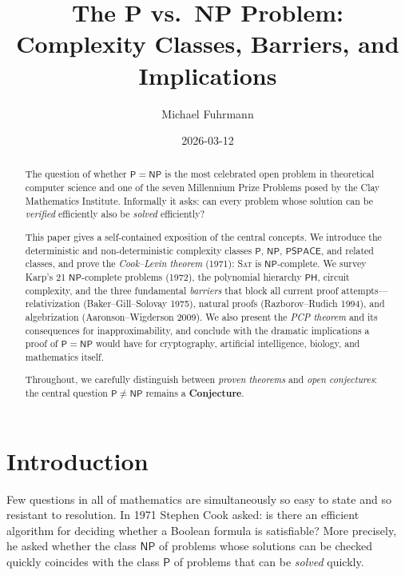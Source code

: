 \documentclass[12pt,a4paper]{amsart}
\title[The P vs.\ NP Problem]{%
  The P vs.\ NP Problem:\\
  Complexity Classes, Barriers, and Implications}
\author{Michael Fuhrmann}
\date{2026-03-12}
\theoremstyle{definition}
\newcommand{\Pclass}{\mathsf{P}}
\newcommand{\NP}{\mathsf{NP}}
\newcommand{\PSPACE}{\mathsf{PSPACE}}
\newcommand{\PH}{\mathsf{PH}}
\newcommand{\SAT}{\textsc{Sat}}
\begin{document}
\begin{abstract}
The question of whether $\Pclass = \NP$ is the most celebrated open problem in
theoretical computer science and one of the seven Millennium Prize Problems posed
by the Clay Mathematics Institute.  Informally it asks: can every problem whose
solution can be \emph{verified} efficiently also be \emph{solved} efficiently?

This paper gives a self-contained exposition of the central concepts.  We
introduce the deterministic and non-deterministic complexity classes
$\Pclass$, $\NP$, $\PSPACE$, and related classes, and prove the
\emph{Cook--Levin theorem} (1971): \SAT{} is $\NP$-complete.  We survey
Karp's 21 $\NP$-complete problems (1972), the polynomial hierarchy $\PH$,
circuit complexity, and the three fundamental \emph{barriers} that block all
current proof attempts---relativization (Baker--Gill--Solovay 1975),
natural proofs (Razborov--Rudich 1994), and algebrization (Aaronson--Wigderson
2009).  We also present the \emph{PCP theorem} and its consequences for
inapproximability, and conclude with the dramatic implications a proof of
$\Pclass = \NP$ would have for cryptography, artificial intelligence, biology,
and mathematics itself.

Throughout, we carefully distinguish between \emph{proven theorems} and
\emph{open conjectures}: the central question $\Pclass \neq \NP$ remains a
\textbf{Conjecture}.
\end{abstract}

\maketitle

\tableofcontents

\section{Introduction}

Few questions in all of mathematics are simultaneously so easy to state and so
resistant to resolution.  In 1971 Stephen Cook asked: is there an efficient
algorithm for deciding whether a Boolean formula is satisfiable?  More
precisely, he asked whether the class $\NP$ of problems whose solutions can be
checked quickly coincides with the class $\Pclass$ of problems that can be
\emph{solved} quickly.
\end{document}
